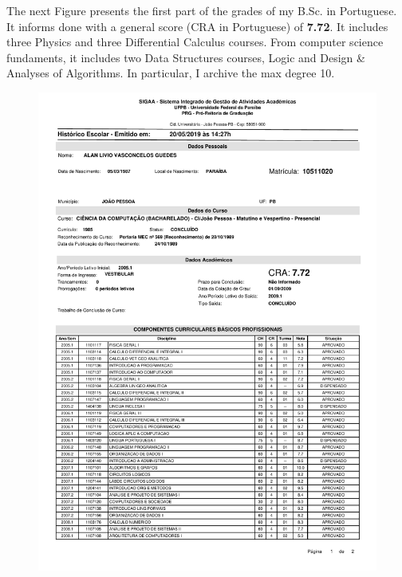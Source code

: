 \documentclass[10pt,a4paper,sans,colorlinks]{moderncv}
\begin{document}
The next Figure presents the first part of the grades of my B.Sc. in Portuguese.
It informs done with a general score (CRA in Portuguese) of \textbf{7.72}.
It includes three Physics and three Differential Calculus courses.
From computer science fundaments, it includes two Data Structures courses, Logic and Design \& Analyses of Algorithms. In particular, I archive the max degree 10.
\vspace{2em}
\begin{figure}
    \centering
    \includegraphics[align=t,width=\textwidth,height=0.75\textheight, keepaspectratio=true, trim=0cm 0cm 0cm 2cm]{certificates/bsc-grades.pdf}
\end{figure}

\newpage
\end{document}

